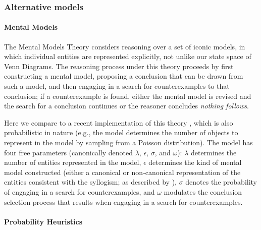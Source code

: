 \documentclass[floatsintext, man]{apa6}
\begin{document}
\subsubsection{Alternative models}

\paragraph{Mental Models}

The Mental Models Theory considers reasoning over a set of iconic models, in which individual entities are represented explicitly, not unlike our state space of Venn Diagrams. 
The reasoning process under this theory proceeds by first constructing a mental model, proposing a conclusion that can be drawn from such a model, and then engaging in a search for counterexamples to that conclusion; if a counterexample is found, either the mental model is revised and the search for a conclusion continues or the reasoner concludes \emph{nothing follows}. 

Here we compare to a recent implementation of this theory \cite<the mReasoner model>{khemlani2013processes}, which is also probabilistic in nature (e.g., the model determines the number of objects to represent in the model by sampling  from a Poisson distribution). 
The model has four free parameters (canonically denoted $\lambda$, $\epsilon$, $\sigma$, and $\omega$): 
$\lambda$ determines the number of entities represented in the model, $\epsilon$ determines the kind of mental model constructed (either a canonical or non-canonical representation of the entities consistent with the syllogism; as described by ), $\sigma$ denotes the probability of engaging in a search for counterexamples, and $\omega$ modulates the conclusion selection process that results when engaging in a search for counterexamples.  

\paragraph{Probability Heuristics} 
\end{document}
